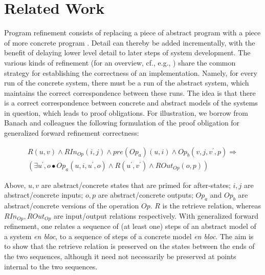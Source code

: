 \documentclass[10pt, conference, compsocconf]{IEEEtran}
\begin{document}
\section{Related Work}\label{sect:relatedwork}
Program refinement consists of replacing a piece of abstract program with a piece of more concrete program \cite{Wirth:1971:CACM,Dijkstra:1972,Hoare:1972:AInf}. Detail can thereby be added incrementally, with the benefit of delaying lower level detail to later steps of system development. The various kinds of refinement (for an overview, cf., e.g., \cite{deRoever+:1998}) share the common strategy for establishing the correctness of an implementation. Namely, for every run of the concrete system, there must be a run of the abstract system, which maintains the correct correspondence between these runs. The idea is that there is a correct correspondence between concrete and abstract models of the systems in question, which leads to proof obligations. For illustration, we borrow from Banach and colleagues \cite{Banach+:2007:FI} the following formulation of the proof obligation for generalized forward refinement correctness: 

\begin{small}
\begin{multline*}
R(u, v) \wedge RIn_{Op}(i,j) \wedge pre(Op_{a})(u,i) \wedge Op_{b}(v,j,v^{\prime},p) \Rightarrow \\
(\exists u^{\prime}, o \bullet Op_{a}(u,i,u^{\prime},o) \wedge R(u^{\prime}, v^{\prime}) \wedge ROut_{Op}(o,p))
\end{multline*}
\end{small}

\noindent Above, $u, v$ are abstract/concrete states that are primed for after-states; $i, j$ are abstract/concrete inputs; $o, p$ are abstract/concrete outputs; $Op_{a}$ and $Op_{b}$ are abstract/concrete versions of the operation $Op$. $R$ is the retrieve relation, whereas $RIn_{Op}, ROut_{Op}$ are input/output relations respectively. With generalized forward refinement, one relates a sequence of (at least one) steps of an abstract model of a system \textit{en bloc}, to a sequence of steps of a concrete model \textit{en bloc}. The aim is to show that the retrieve relation is preserved on the states between the ends of the two sequences, although it need not necessarily be preserved at points internal to the two sequences. 
\end{document}
